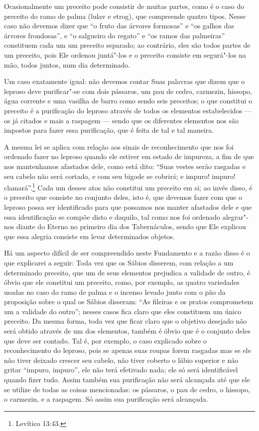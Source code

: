 Ocasionalmente um preceito pode consistir de muitas partes, como é o
caso do preceito do ramo de palma (lulav\starr{} e etrog\starr), que
compreende quatro tipos. Nesse caso não devemos dizer que ``o fruto das
árvores formosas'' e ``os galhos das árvores frondosas'', e ``o
salgueiro do regato'' e ``os ramos das palmeiras'' constituem cada um
um preceito separado; ao contrário, eles são todos partes de um
preceito, pois Ele ordenou juntá"-los e o preceito consiste em segurá"-los
na mão, todos juntos, num dia determinado.

Um caso exatamente igual: não devemos contar Suas palavras que dizem que
o leproso deve purificar"-se com dois pássaros, um pau de cedro,
carmezin, hissopo, água corrente e uma vasilha de barro como sendo seis
preceitos; o que constitui o preceito é a purificação do leproso
através de todos os elementos estabelecidos --- os já citados e mais a
raspagem --- sendo que os diferentes elementos nos são impostos para
fazer essa purificação, que é feita de tal e tal maneira.

A mesma lei se aplica com relação aos sinais de reconhecimento que nos
foi ordenado fazer no leproso quando ele estiver em estado de impureza,
a fim de que nos mantenhamos afastados dele, como está dito: ``Suas
vestes serão rasgadas e seu cabelo não será cortado, e com seu bigode se
cobrirá; e impuro! impuro! clamará''.\footnote{Levítico 13:43.} Cada um desses
atos não constitui um preceito em si; ao invés disso, é o preceito que
consiste no conjunto deles,
isto é, que devemos fazer com que o leproso possa ser identificado para
que possamos nos manter afastados dele e que essa identificação se
compõe disto e daquilo, tal como nos foi ordenado alegrar"-nos diante do
Eterno no primeiro dia dos Tabernáculos, sendo que Ele explicou que essa
alegria consiste em levar determinados objetos.

Há um aspecto difícil de ser compreendido neste Fundamento e a razão
disso é o que explicarei a seguir: Toda vez que os Sábios disserem, com
relação a um determinado preceito, que um de seus elementos prejudica a
validade de outro, é óbvio que ele constitui um preceito, como, por
exemplo, as quatro variedades usadas no caso do ramo de palma e o
incenso levado junto com o pão da proposição sobre o qual os Sábios
disseram: ``As fileiras e os pratos comprometem um a validade do
outro''; nesses casos fica claro que eles constituem um único preceito.
Da mesma forma, toda vez que ficar claro que o objetivo desejado não
será obtido através de um dos elementos, também é óbvio que é o conjunto
deles que deve ser contado. Tal é, por exemplo, o caso explicado sobre o
reconhecimento do leproso, pois se apenas suas roupas forem rasgadas
mas se ele não tiver deixado crescer seu cabelo, não tiver coberto o
lábio superior e não gritar ``impuro, impuro'', ele não terá efetivado
nada; ele só será identificável quando fizer tudo. Assim também sua
purificação não será alcançada até que ele se utilize de todas as coisas
mencionadas: os pássaros, o pau de cedro, o hissopo, o carmezin, e a
raspagem. Só assim sua purificação será alcançada.

